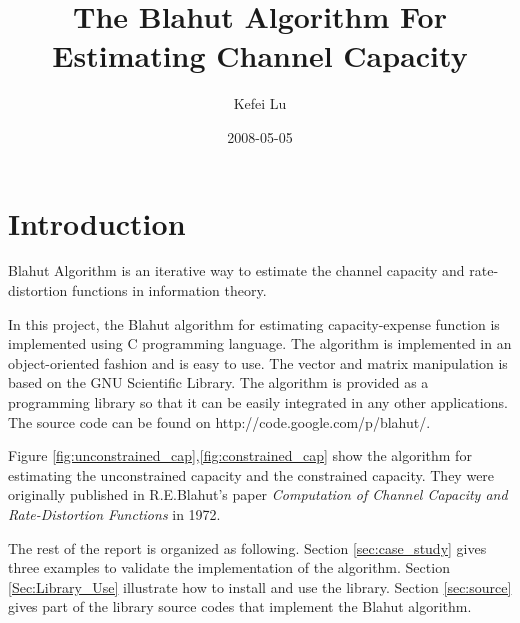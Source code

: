 \documentclass[a4paper,10pt]{article}
\author{Kefei Lu}
\title{The Blahut Algorithm For Estimating Channel Capacity}
\date{2008-05-05}
\begin{document}
\maketitle


\section{Introduction}
Blahut Algorithm is an iterative way to estimate the channel capacity and rate-distortion functions in information theory. 

In this project, the Blahut algorithm for estimating capacity-expense function is implemented using C programming language. The algorithm is implemented in an object-oriented fashion and is easy to use. The vector and matrix manipulation is based on the GNU Scientific Library. The algorithm is provided as a programming library so that it can be easily integrated in any other applications. The source code can be found on http://code.google.com/p/blahut/.

Figure \ref{fig:unconstrained_cap},\ref{fig:constrained_cap} show the algorithm for estimating the unconstrained capacity and the constrained capacity. They were originally published in R.E.Blahut's paper \textit{Computation of Channel Capacity and Rate-Distortion Functions} in 1972. 

The rest of the report is organized as following. Section \ref{sec:case_study} gives three examples to validate the implementation of the algorithm. Section \ref{Sec:Library_Use} illustrate how to install and use the library. Section \ref{sec:source} gives part of the library source codes that implement the Blahut algorithm.
\end{document}
